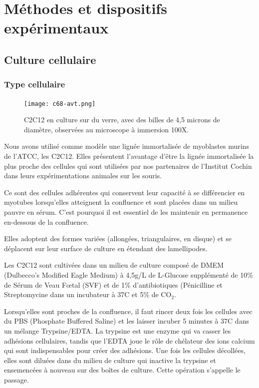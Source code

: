 %
%

\chapter{Méthodes et dispositifs expérimentaux}

\section{Culture cellulaire}
	\subsection{Type cellulaire}
	
	\begin{figure}
	\texttt{[image: c68-avt.png]}
	\caption{C2C12 en culture sur du verre, avec des billes de 4,5 microns de diamètre, observées au microscope à immersion 100X.}
	\end{figure}
	
	Nous avons utilisé comme modèle une lignée immortalisée de myoblastes murins de l'ATCC, les C2C12. Elles présentent l'avantage d'être la lignée immortalisée la plus proche des cellules qui sont utilisées par nos partenaires de l'Institut Cochin dans leurs expérimentations animales sur les souris. 
	
	Ce sont des cellules adhérentes qui conservent leur capacité à se différencier en myotubes lorsqu'elles atteignent la confluence et sont placées dans un milieu pauvre en sérum. C'est pourquoi il est essentiel de les maintenir en permanence en-dessous de la confluence. 
	
	Elles adoptent des formes variées (allongées, triangulaires, en disque) et se déplacent sur leur surface de culture en étendant des lamellipodes. 
	
	Les C2C12 sont cultivées dans un milieu de culture composé de DMEM (Dulbecco's Modified Eagle Medium) à 4,5g/L de L-Glucose supplémenté de 10\% de Sérum de Veau F\oe tal (SVF) et de 1\% d'antibiotiques (Pénicilline et Streptomycine dans un incubateur à 37\degres   C et 5\% de CO$_2$. 
	
	
	Lorsqu'elles sont proches de la confluence, il faut rincer deux fois les cellules avec du PBS (Phosphate Buffered Saline) et les laisser incuber 5 minutes à 37\degres   C dans un mélange Trypsine/EDTA. La trypsine est une enzyme qui va casser les adhésions cellulaires, tandis que l'EDTA joue le rôle de chélateur des ions calcium qui sont indispensables pour créer des adhésions. Une fois les cellules décollées, elles sont diluées dans du milieu de culture qui inactive la trypsine et ensemencées à nouveau sur des boîtes de culture. Cette opération s'appelle le passage. 
	 
